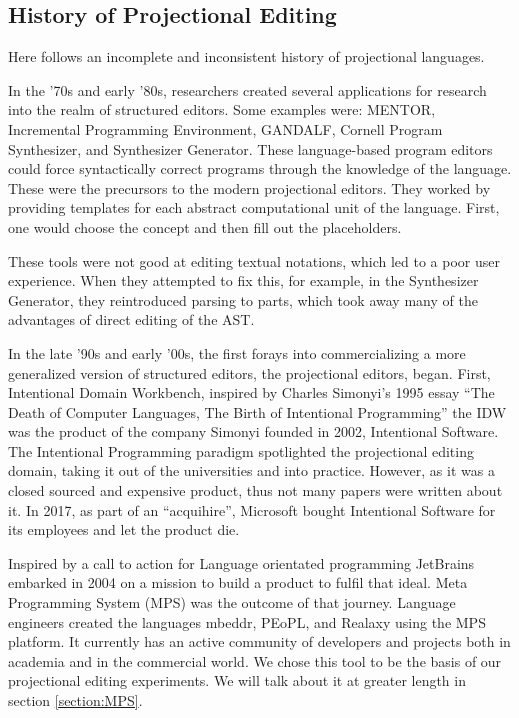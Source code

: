\subsection{History of Projectional Editing}

Here follows an incomplete and inconsistent history of projectional languages.

In the '70s and early '80s, researchers created several applications for research into the realm of structured editors.
Some examples were: MENTOR\cite{donzeau1980programming}, Incremental Programming Environment\cite{medina1981incremental}, GANDALF\cite{NotkinDavid1985TGp}, Cornell Program Synthesizer\cite{teitelbaum1981cornell}, and Synthesizer Generator\cite{reps2012synthesizer}.
These language-based program editors could force syntactically correct programs through the knowledge of the language.
These were the precursors to the modern projectional editors. 
They worked by providing templates for each abstract computational unit of the language.
First, one would choose the concept and then fill out the placeholders.

These tools were not good at editing textual notations, which led to a poor user experience.
When they attempted to fix this, for example, in the Synthesizer Generator, they reintroduced parsing to parts, which took away many of the advantages of direct editing of the AST.

In the late '90s and early '00s, the first forays into commercializing a more generalized version of structured editors, the projectional editors, began.
First, Intentional Domain Workbench, inspired by Charles Simonyi's 1995 essay ``The Death of Computer Languages, The Birth of Intentional Programming''\cite{simonyi1995death} the IDW was the product of the company Simonyi founded in 2002, Intentional Software. 
The Intentional Programming paradigm spotlighted the projectional editing domain, taking it out of the universities and into practice.
However, as it was a closed sourced and expensive product, thus not many papers were written about it.
In 2017, as part of an ``acquihire'', Microsoft bought Intentional Software for its employees and let the product die.

Inspired by a call to action for Language orientated programming\cite{dmitriev2004language} JetBrains embarked in 2004 on a mission to build a product to fulfil that ideal.  
Meta Programming System (MPS) was the outcome of that journey.   
Language engineers created the languages mbeddr, PEoPL, and Realaxy using the MPS platform.  
It currently has an active community of developers and projects both in academia and in the commercial world. 
We chose this tool to be the basis of our projectional editing experiments. 
We will talk about it at greater length in section \ref{section:MPS}.

